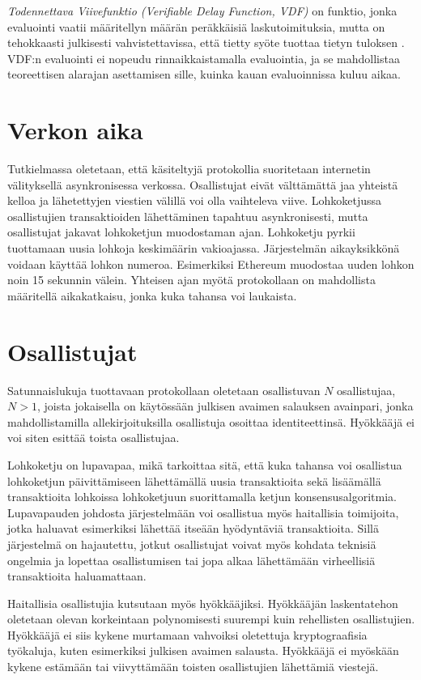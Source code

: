 \textit{Todennettava Viivefunktio (Verifiable Delay Function, VDF)} on funktio, jonka evaluointi vaatii määritellyn määrän peräkkäisiä laskutoimituksia, mutta on tehokkaasti julkisesti vahvistettavissa, että tietty syöte tuottaa tietyn tuloksen \cite{boneh_verifiable_2018}. VDF:n evaluointi ei nopeudu rinnaikkaistamalla evaluointia, ja se mahdollistaa teoreettisen alarajan asettamisen sille, kuinka kauan evaluoinnissa kuluu aikaa.

\section{Verkon aika}
Tutkielmassa oletetaan, että käsiteltyjä protokollia suoritetaan internetin välityksellä asynkronisessa verkossa. Osallistujat eivät välttämättä jaa yhteistä kelloa ja lähetettyjen viestien välillä voi olla vaihteleva viive. Lohkoketjussa osallistujien transaktioiden lähettäminen tapahtuu asynkronisesti, mutta osallistujat jakavat lohkoketjun muodostaman ajan. Lohkoketju pyrkii tuottamaan uusia lohkoja keskimäärin vakioajassa. Järjestelmän aikayksikkönä voidaan käyttää lohkon numeroa. Esimerkiksi Ethereum muodostaa uuden lohkon noin 15 sekunnin välein. Yhteisen ajan myötä protokollaan on mahdollista määritellä aikakatkaisu, jonka kuka tahansa voi laukaista.

\section{Osallistujat}

Satunnaislukuja tuottavaan protokollaan oletetaan osallistuvan $N$ osallistujaa, $N > 1$, joista jokaisella on käytössään julkisen avaimen salauksen avainpari, jonka mahdollistamilla allekirjoituksilla osallistuja osoittaa identiteettinsä. Hyökkääjä ei voi siten esittää toista osallistujaa. 

Lohkoketju on lupavapaa, mikä tarkoittaa sitä, että kuka tahansa voi osallistua lohkoketjun päivittämiseen lähettämällä uusia transaktioita sekä lisäämällä transaktioita lohkoissa lohkoketjuun suorittamalla ketjun konsensusalgoritmia. Lupavapauden johdosta järjestelmään voi osallistua myös haitallisia toimijoita, jotka haluavat esimerkiksi lähettää itseään hyödyntäviä transaktioita. Sillä järjestelmä on hajautettu, jotkut osallistujat voivat myös kohdata teknisiä ongelmia ja lopettaa osallistumisen tai jopa alkaa lähettämään virheellisiä transaktioita haluamattaan.

Haitallisia osallistujia kutsutaan myös hyökkääjiksi. Hyökkääjän laskentatehon oletetaan olevan korkeintaan polynomisesti suurempi kuin rehellisten osallistujien. Hyökkääjä ei siis kykene murtamaan vahvoiksi oletettuja kryptograafisia työkaluja, kuten esimerkiksi julkisen avaimen salausta. Hyökkääjä ei myöskään kykene estämään tai viivyttämään toisten osallistujien lähettämiä viestejä.

